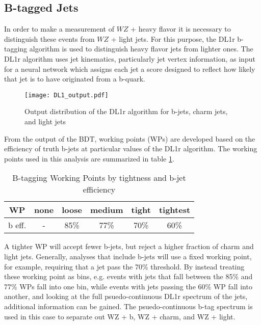 \subsection{B-tagged Jets}
\label{subsec:bjets}

In order to make a measurement of $WZ$ + heavy flavor it is necessary to distinguish these events from $WZ$ + light jets. For this purpose, the DL1r b-tagging algorithm is used to distinguish heavy flavor jets from lighter ones. The DL1r algorithm uses jet kinematics, particularly jet vertex information, as input for a neural network which assigns each jet a score designed to reflect how likely that jet is to have originated from a b-quark. 

\begin{figure}[H] 
    \centering
    \texttt{[image: DL1\_output.pdf]} 
    \caption{Output distribution of the DL1r algorithm for b-jets, charm jets, and light jets}
    \label{fig:DL1r}
\end{figure}

From the output of the BDT, working points (WPs) are developed based on the efficiency of truth b-jets at particular values of the DL1r algorithm. The working points used in this analysis are summarized in table \ref{tab:btag_WPs}. 

\begin{table}[H] 
\begin{center}
\begin{tabular}{|c|ccccc|}
    \hline
       WP &  none & loose & medium & tight & tightest\\
       \hline
     b eff. & - & 85\% & 77\% & 70\% & 60\% \\ 
    \hline
    \end{tabular}    
    \caption{B-tagging Working Points by tightness and b-jet efficiency}
    \label{tab:btag_WPs}
    \end{center}
\end{table}

A tighter WP will accept fewer b-jets, but reject a higher fraction of charm and light jets. Generally, analyses that include b-jets will use a fixed working point, for example, requiring that a jet pass the 70\% threshold. By instead treating these working point as bins, e.g. events with jets that fall between the 85\% and 77\% WPs fall into one bin, while events with jets passing the 60\% WP fall into another, and looking at the full psuedo-continuous DL1r spectrum of the jets, additional information can be gained. The psuedo-continuous b-tag spectrum is used in this case to separate out WZ + b, WZ + charm, and WZ + light. 

